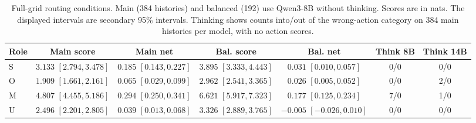 \begin{table}[t]
\centering
\begin{tabular}{@{}lcccccc@{}}
\toprule
Role & Main score & Main net & Bal. score & Bal. net & Think 8B & Think 14B \\
\midrule
\shortstack{S\\{}} & \shortstack{$3.133$\\$[2.794, 3.478]$} & \shortstack{$0.185$\\$[0.143, 0.227]$} & \shortstack{$3.895$\\$[3.333, 4.443]$} & \shortstack{$0.031$\\$[0.010, 0.057]$} & 0/0 & 0/0 \\
\shortstack{O\\{}} & \shortstack{$1.909$\\$[1.661, 2.161]$} & \shortstack{$0.065$\\$[0.029, 0.099]$} & \shortstack{$2.962$\\$[2.541, 3.365]$} & \shortstack{$0.026$\\$[0.005, 0.052]$} & 0/0 & 2/0 \\
\shortstack{M\\{}} & \shortstack{$4.807$\\$[4.455, 5.186]$} & \shortstack{$0.294$\\$[0.250, 0.341]$} & \shortstack{$6.621$\\$[5.917, 7.323]$} & \shortstack{$0.177$\\$[0.125, 0.234]$} & 7/0 & 1/0 \\
\shortstack{U\\{}} & \shortstack{$2.496$\\$[2.201, 2.805]$} & \shortstack{$0.039$\\$[0.013, 0.068]$} & \shortstack{$3.326$\\$[2.889, 3.765]$} & \shortstack{$-0.005$\\$[-0.026, 0.010]$} & 0/0 & 0/0 \\
\bottomrule
\end{tabular}
\caption{Full-grid routing conditions. Main (384 histories) and balanced (192) use Qwen3-8B without thinking. Scores are in nats. The displayed intervals are secondary 95\% intervals. Thinking shows counts into/out of the wrong-action category on 384 main histories per model, with no action scores.}
\label{tab:conditions}
\end{table}
